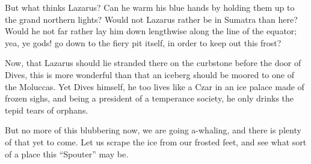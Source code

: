 \documentclass[12pt,ebook,oneside,openany]{memoir} %
\begin{document}
But what thinks Lazarus? Can he warm his blue hands by holding them up to the grand northern lights? Would not Lazarus rather be in Sumatra than here? Would he not far rather lay him down lengthwise along the line of the equator; yea, ye gods! go down to the fiery pit itself, in order to keep out this frost?

Now, that Lazarus should lie stranded there on the curbstone before the door of Dives, this is more wonderful than that an iceberg should be moored to one of the Moluccas. Yet Dives himself, he too lives like a Czar in an ice palace made of frozen sighs, and being a president of a temperance society, he only drinks the tepid tears of orphans.

But no more of this blubbering now, we are going a-whaling, and there is plenty of that yet to come. Let us scrape the ice from our frosted feet, and see what sort of a place this “Spouter” may be.
\end{document}

